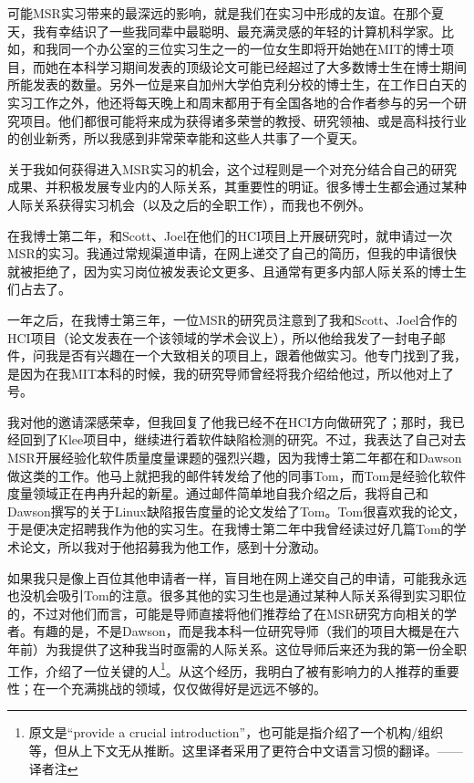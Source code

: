 \documentclass[letter,12pt]{book}
\begin{document}
\begin{CJK}{UTF8}{gbsn}
可能MSR实习带来的最深远的影响，就是我们在实习中形成的友谊。在那个夏天，我有幸结识了一些我同辈中最聪明、最充满灵感的年轻的计算机科学家。比如，和我同一个办公室的三位实习生之一的一位女生即将开始她在MIT的博士项目，而她在本科学习期间发表的顶级论文可能已经超过了大多数博士生在博士期间所能发表的数量。另外一位是来自加州大学伯克利分校的博士生，在工作日白天的实习工作之外，他还将每天晚上和周末都用于有全国各地的合作者参与的另一个研究项目。他们都很可能将来成为获得诸多荣誉的教授、研究领袖、或是高科技行业的创业新秀，所以我感到非常荣幸能和这些人共事了一个夏天。

\breakline

关于我如何获得进入MSR实习的机会，这个过程则是一个对充分结合自己的研究成果、并积极发展专业内的人际关系，其重要性的明证。很多博士生都会通过某种人际关系获得实习机会（以及之后的全职工作），而我也不例外。

在我博士第二年，和Scott、Joel在他们的HCI项目上开展研究时，就申请过一次MSR的实习。我通过常规渠道申请，在网上递交了自己的简历，但我的申请很快就被拒绝了，因为实习岗位被发表论文更多、且通常有更多内部人际关系的博士生们占去了。

一年之后，在我博士第三年，一位MSR的研究员注意到了我和Scott、Joel合作的HCI项目（论文发表在一个该领域的学术会议上），所以他给我发了一封电子邮件，问我是否有兴趣在一个大致相关的项目上，跟着他做实习。他专门找到了我，是因为在我MIT本科的时候，我的研究导师曾经将我介绍给他过，所以他对上了号。

我对他的邀请深感荣幸，但我回复了他我已经不在HCI方向做研究了；那时，我已经回到了Klee项目中，继续进行着软件缺陷检测的研究。不过，我表达了自己对去MSR开展经验化软件质量度量课题的强烈兴趣，因为我博士第二年都在和Dawson做这类的工作。他马上就把我的邮件转发给了他的同事Tom，而Tom是经验化软件度量领域正在冉冉升起的新星。通过邮件简单地自我介绍之后，我将自己和Dawson撰写的关于Linux缺陷报告度量的论文发给了Tom。Tom很喜欢我的论文，于是便决定招聘我作为他的实习生。在我博士第二年中我曾经读过好几篇Tom的学术论文，所以我对于他招募我为他工作，感到十分激动。

如果我只是像上百位其他申请者一样，盲目地在网上递交自己的申请，可能我永远也没机会吸引Tom的注意。很多其他的实习生也是通过某种人际关系得到实习职位的，不过对他们而言，可能是导师直接将他们推荐给了在MSR研究方向相关的学者。有趣的是，不是Dawson，而是我本科一位研究导师（我们的项目大概是在六年前）为我提供了这种我当时亟需的人际关系。这位导师后来还为我的第一份全职工作，介绍了一位关键的人\footnote{原文是``provide a crucial introduction''，也可能是指介绍了一个机构/组织等，但从上下文无从推断。这里译者采用了更符合中文语言习惯的翻译。——译者注}。从这个经历，我明白了被有影响力的人推荐的重要性；在一个充满挑战的领域，仅仅做得好是远远不够的。


\end{CJK}
\end{document}
